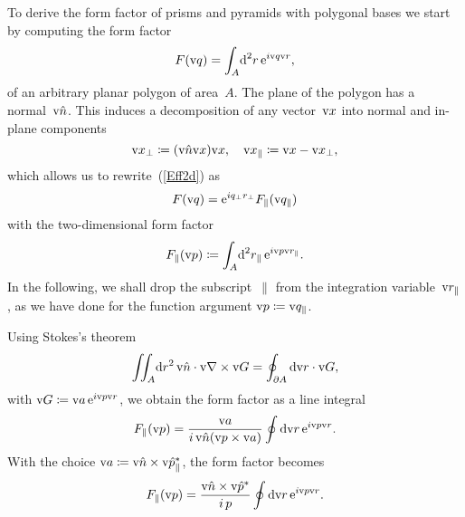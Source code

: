 To derive the form factor of prisms and pyramids with polygonal bases
we start by computing the form factor
\begin{equation}\label{Eff2d}
  F(\text{v}{q})=\int_A\!\text{d}^2r\, \text{e}^{i\text{v}{q}\text{v}{r}},
\end{equation}
of an arbitrary planar polygon of area~$A$.
The plane of the polygon has a normal~$\text{v}{\hat n}$.
This induces a decomposition of any vector~$\text{v}{x}$ into normal
and in-plane components
\begin{equation}
  \text{v}{x}_\perp\coloneqq (\text{v}{\hat n}\text{v}{x})\text{v}{x},\quad
  \text{v}{x}_\parallel\coloneqq\text{v}{x}-\text{v}{x}_\perp,
\end{equation}
which allows us to rewrite~(\ref{Eff2d}) as
%
\begin{equation}
  F(\text{v}{q})=\text{e}^{iq_\perp r_\perp}F_\parallel(\text{v}{q}_\parallel)
\end{equation}
with the two-dimensional form factor
\begin{equation}
  F_\parallel(\text{v}{p})
  \coloneqq \int_A\!\text{d}^2r_\parallel\, \text{e}^{i\text{v}{p}\text{v}{r}_\parallel}.
\end{equation}
In the following, we shall drop the subscript~$\parallel$
from the integration variable~$\text{v}{r}_\parallel$,
as we have done for the function argument $\text{v}{p}\coloneqq\text{v}{q}_\parallel$.

Using Stokes's theorem
\begin{equation}
  \iint_A\!\text{d} r^2\,\text{v}{\hat n}\cdot\text{v}{\nabla}\times\text{v}{G} = \oint_{\partial A} \text{d}\text{v}{r}\cdot\text{v}{G},
\end{equation}
with $\text{v}{G}\coloneqq\text{v}{a}\, \text{e}^{i\text{v}{p}\text{v}{r}}$,
we obtain the form factor as a line integral
\begin{equation}
  F_\parallel(\text{v}{p})=\frac{\text{v}{a}}{i\, \text{v}{\hat n}(\text{v}{p}\times\text{v}{a})} \oint \text{d}\text{v}{r}\,\text{e}^{i\text{v}{p}\text{v}{r}}.
\end{equation}
With the choice $\text{v}{a}\coloneqq\text{v}{\hat n}\times\text{v}{\hat p}_\parallel^*$,
the form factor becomes
\begin{equation}
  F_\parallel(\text{v}{p})=\frac{\text{v}{\hat n}\times\text{v}{\hat p}^*}{i\,p} \oint \text{d}\text{v}{r}\,\text{e}^{i\text{v}{p}\text{v}{r}}.
\end{equation}

